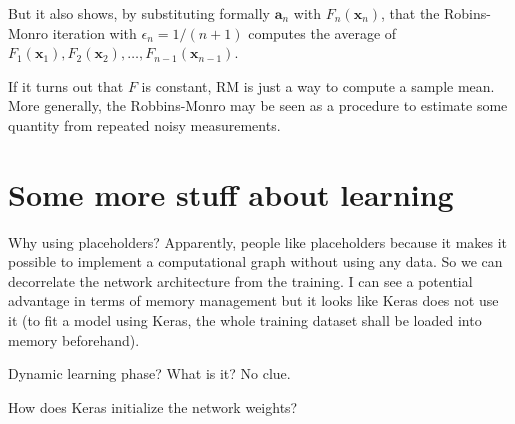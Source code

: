 \documentclass{article}
\def\x{{\mathbf{x}}}
\def\a{{\mathbf{a}}}
\begin{document}
But it also shows, by substituting formally $\a_n$ with $F_n(\x_n)$, that the Robins-Monro iteration with $\epsilon_n=1/(n+1)$ computes the average of $F_1(\x_1), F_2(\x_2), \ldots, F_{n-1}(\x_{n-1})$.

If it turns out that $F$ is constant, RM is just a way to compute a sample mean. More generally, the Robbins-Monro may be seen as a procedure to estimate some quantity from repeated noisy measurements.


\section{Some more stuff about learning}

Why using placeholders? Apparently, people like placeholders because it makes it possible to implement a computational graph without using any data. So we can decorrelate the network architecture from the training. I can see a potential advantage in terms of memory management but it looks like Keras does not use it (to fit a model using Keras, the whole training dataset shall be loaded into memory beforehand).

Dynamic learning phase? What is it? No clue.

How does Keras initialize the network weights?







\end{document}
